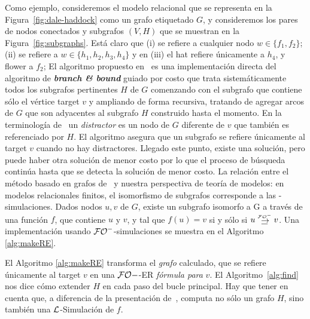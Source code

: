 Como ejemplo, consideremos el modelo relacional que se representa en la
Figura~\ref{fig:dale-haddock} como un grafo etiquetado $G$, y consideremos los pares de nodos conectados y subgrafos $(V, H)$ que se muestran en 
la Figura~\ref{fig:subgraphs}. Est\'a claro que (i) se refiere a cualquier nodo $w\in\{f_1,f_2\}$; (ii) se refiere a $w\in\{h_1,h_2,h_3,h_4\}$
y en (iii) el hat refiere \'unicamente a $h_4$, y flower a $f_2$; 
El algoritmo propuesto en~\cite{graph} es una
implementaci\'on directa del algoritmo de {\bf \emph{branch \& bound}} guiado por costo que trata sistem\'aticamente todos los
subgrafos pertinentes $H$ de $G$ comenzando con el subgrafo
que contiene s\'olo el v\'ertice target $v$ y ampliando de forma recursiva, tratando de
agregar arcos de $G$ que son adyacentes al subgrafo $H$ construido
hasta el momento. En la terminolog\'ia de~\cite{graph} un {\em distractor} es un nodo de $G$ diferente de
$v$ que tambi\'en es referenciado por $H$.
El algoritmo asegura que un subgrafo se refiere \'unicamente al target $v$ cuando no hay distractores. Llegado este punto, existe una
soluci\'on, pero puede haber otra
soluci\'on de menor costo por lo que el proceso de b\'usqueda contin\'ua hasta que
se detecta la soluci\'on de menor costo. 
La relaci\'on entre el m\'etodo basado en grafos
de~\cite{graph} y nuestra perspectiva de teor\'ia de modelos: en
modelos relacionales finitos, el isomorfismo de subgrafos corresponde a las
\EPFOL-simulaciones. Dados nodos $u,v$ de
$G$, existe un subgrafo isomorfo a G a trav\'es de una funci\'on $f$, que contiene $ u $ y
$v$, y tal que $f(u)=v$ si y s\'olo si $u \simul{\+\EPFOL} v$. Una implementaci\'on usando $\mathcal{{\mathcal{FO}^-}}$-simulaciones se muestra en el Algoritmo \ref{alg:makeRE}.

El Algoritmo \ref{alg:makeRE} transforma el {\em grafo} calculado, que se refiere \'unicamente al target $v$ en una $\mathcal{FO}-$-ER {\em
f\'ormula para} $v$. El Algoritmo~\ref{alg:find} nos dice c\'omo extender $H$ en cada paso
del bucle principal. Hay que tener en cuenta que, a diferencia de la
presentaci\'on de~\cite{graph},  computa
no s\'olo un grafo $H$, sino tambi\'en una $\mathcal{L}$-Simulaci\'on de $f$.

